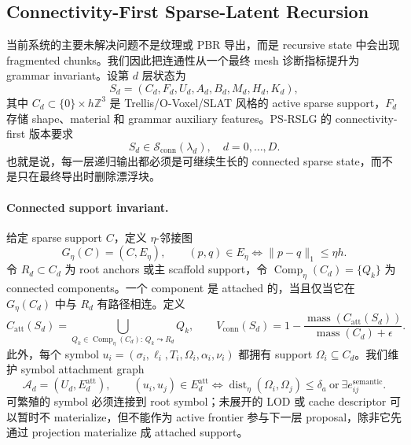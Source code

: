 \subsection{Connectivity-First Sparse-Latent Recursion}

当前系统的主要未解决问题不是纹理或 PBR 导出，而是 recursive state 中会出现 fragmented chunks。我们因此把连通性从一个最终 mesh 诊断指标提升为 grammar invariant。设第 \(d\) 层状态为
\begin{equation}
S_d=(C_d,F_d,U_d,A_d,B_d,M_d,H_d,K_d),
\end{equation}
其中 \(C_d\subset\{0\}\times h\mathbb{Z}^3\) 是 Trellis/O-Voxel/SLAT 风格的 active sparse support，\(F_d\) 存储 shape、material 和 grammar auxiliary features。PS-RSLG 的 connectivity-first 版本要求
\begin{equation}
\boxed{\qquad S_d\in\mathcal{S}_{\mathrm{conn}}(\lambda_d),\quad d=0,\ldots,D.\qquad}
\end{equation}
也就是说，每一层递归输出都必须是可继续生长的 connected sparse state，而不是只在最终导出时删除漂浮块。

\paragraph{Connected support invariant.}
给定 sparse support \(C\)，定义 \(\eta\)-邻接图
\begin{equation}
G_\eta(C)=(C,E_\eta),\qquad
(p,q)\in E_\eta \Longleftrightarrow \|p-q\|_1\le \eta h .
\end{equation}
令 \(R_d\subset C_d\) 为 root anchors 或主 scaffold support，令 \(\operatorname{Comp}_\eta(C_d)=\{Q_k\}\) 为 connected components。一个 component 是 attached 的，当且仅当它在 \(G_\eta(C_d)\) 中与 \(R_d\) 有路径相连。定义
\begin{equation}
C_{\mathrm{att}}(S_d)
=
\bigcup_{Q_k\in\operatorname{Comp}_\eta(C_d):\,Q_k\leadsto R_d} Q_k,
\qquad
V_{\mathrm{conn}}(S_d)
=
1-\frac{\operatorname{mass}(C_{\mathrm{att}}(S_d))}
{\operatorname{mass}(C_d)+\epsilon}.
\end{equation}
此外，每个 symbol \(u_i=(\sigma_i,\ell_i,T_i,\Omega_i,\alpha_i,\nu_i)\) 都拥有 support \(\Omega_i\subseteq C_d\)。我们维护 symbol attachment graph
\begin{equation}
\mathcal{A}_d=(U_d,E_d^{\mathrm{att}}),\qquad
(u_i,u_j)\in E_d^{\mathrm{att}}
\Longleftrightarrow
\operatorname{dist}_\eta(\Omega_i,\Omega_j)\le \delta_a
\ \mathrm{or}\ 
\exists e_{ij}^{\mathrm{semantic}} .
\end{equation}
可繁殖的 symbol 必须连接到 root symbol；未展开的 LOD 或 cache descriptor 可以暂时不 materialize，但不能作为 active frontier 参与下一层 proposal，除非它先通过 projection materialize 成 attached support。

